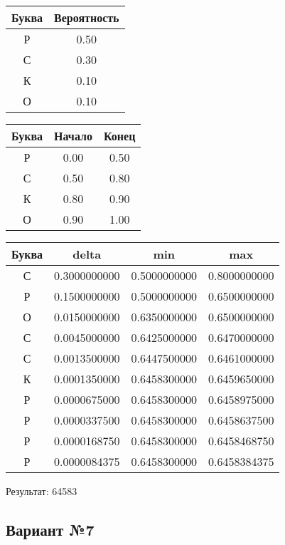 \documentclass[a4paper, 12pt]{article}
\begin{document}
\begin{center}
 \begin{tabular}{ |c|c| } 
  \hline
     Буква & Вероятность \\ \hline
Р & 0.50\\\hline
С & 0.30\\\hline
К & 0.10\\\hline
О & 0.10
\\ \hline \end{tabular}
\end{center}
\begin{center}
 \begin{tabular}{ |c|c|c| } 
  \hline
     Буква & Начало & Конец \\ \hline
Р & 0.00 & 0.50\\\hline
С & 0.50 & 0.80\\\hline
К & 0.80 & 0.90\\\hline
О & 0.90 & 1.00
\\ \hline \end{tabular}
\end{center}
\begin{center}
 \begin{tabular}{ |c|c|c|c| } 
  \hline
     Буква & delta & min & max \\ \hline
С & 0.3000000000 & 0.5000000000 & 0.8000000000\\\hline
Р & 0.1500000000 & 0.5000000000 & 0.6500000000\\\hline
О & 0.0150000000 & 0.6350000000 & 0.6500000000\\\hline
С & 0.0045000000 & 0.6425000000 & 0.6470000000\\\hline
С & 0.0013500000 & 0.6447500000 & 0.6461000000\\\hline
К & 0.0001350000 & 0.6458300000 & 0.6459650000\\\hline
Р & 0.0000675000 & 0.6458300000 & 0.6458975000\\\hline
Р & 0.0000337500 & 0.6458300000 & 0.6458637500\\\hline
Р & 0.0000168750 & 0.6458300000 & 0.6458468750\\\hline
Р & 0.0000084375 & 0.6458300000 & 0.6458384375
\\ \hline \end{tabular}
\end{center}
Результат: 64583
\pagebreak
\subsection{Вариант №7}
\end{document}
